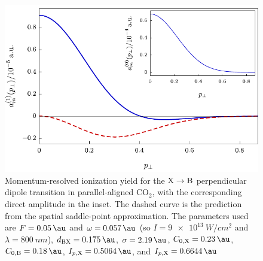 \begin{figure}[htb]
  \centering
  \includegraphics[scale=1]{3-Multi-channel/Figures/figure3D.pdf}
  \caption[Transverse ionization spectra for aligned CO$_2$, coming from the direct and correlation-driven channels, as well as the geometrical saddle-point approximation to the latter]{
  Momentum-resolved ionization yield for the $\mathrm{X}\to\mathrm{B}$ perpendicular dipole transition in parallel-aligned CO$_2$, with the corresponding direct amplitude in the inset. The dashed curve is the prediction from the spatial saddle-point approximation.
  The parameters used are $F=\SI{0.05}{\au}$ and $\omega=\SI{0.057}{\au}$ (so $I=\SI{9e13}{W/cm^2}$ and $\lambda=\SI{800}{nm}$), $d_{\B\X}=\SI{0.175}{\au}$, $\sigma=\SI{2.19}{\au}$, $C_{0,\X}=\SI{0.23}{\au}$, $C_{0,\B}=\SI{0.18}{\au}$, $I_{p,\X}=\SI{0.5064}{\au}$, and $I_{p,\X}=\SI{0.6644}{\au}$
  }
  \label{f3-angular-distribution-plots}
\end{figure}


